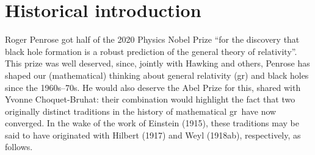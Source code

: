 \documentclass[12pt]{article}
\newcommand{\GR}{{\sc gr}}
\begin{document}
\thispagestyle{empty}
\renewcommand{\thefootnote}{\arabic{footnote}}
\newpage \setcounter{footnote}{0}
\section{Historical introduction}\label{HI}
Roger Penrose got half of the 2020 Physics Nobel Prize ``for the discovery that black hole formation is a robust prediction of the general theory of relativity''. This prize was well deserved, since, jointly with Hawking and others, Penrose  has shaped our (mathematical) thinking about general relativity (\GR) and black holes since the 1960s--70s. He would also deserve the Abel Prize for this,  shared with Yvonne Choquet-Bruhat: their combination would  highlight the fact that two originally distinct traditions in the history of mathematical \GR\ have now converged. In the wake of the work of Einstein (1915), these traditions may be said to have originated with Hilbert (1917) and Weyl (1918ab), respectively, as follows. 
\end{document}
